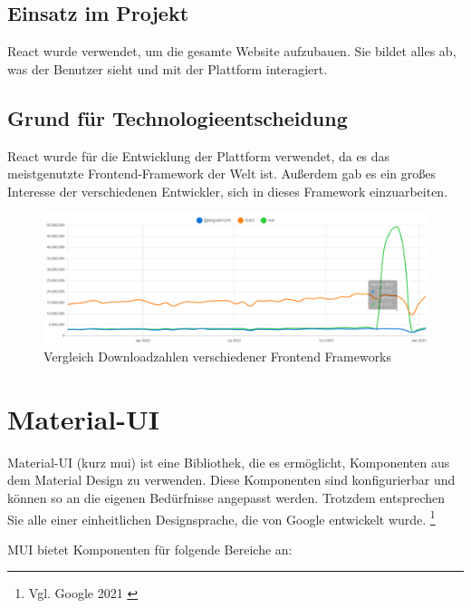 \subsection{Einsatz im Projekt}
\label{sub:reactUsage}

React wurde verwendet, um die gesamte Website aufzubauen.
Sie bildet alles ab, was der Benutzer sieht und mit der Plattform interagiert.

\subsection{Grund für Technologieentscheidung}
\label{sub:reactReason}

React wurde für die Entwicklung der Plattform verwendet, da es das meistgenutzte Frontend-Framework der Welt ist.
Außerdem gab es ein großes Interesse der verschiedenen Entwickler, sich in dieses Framework einzuarbeiten.

\begin{figure}[ht!]
  \begin{centering}
    \includegraphics[width=.75\textwidth]{figures/technical/frontendFrameworks.png}
    \caption{Vergleich Downloadzahlen verschiedener Frontend Frameworks \cite{npm2023}}
    \label{fig:downloadFrontendFrameworks}
  \end{centering}
\end{figure}

\section{Material-UI}
\label{sec:material-ui}

Material-UI (kurz \gls{mui}) ist eine Bibliothek, die es ermöglicht, Komponenten aus dem Material Design zu verwenden.
Diese Komponenten sind konfigurierbar und können so an die eigenen Bedürfnisse angepasst werden.
Trotzdem entsprechen Sie alle einer einheitlichen Designsprache, die von Google entwickelt wurde. \footnote{Vgl. Google 2021 \cite{google2021}}

MUI bietet Komponenten für folgende Bereiche an:

